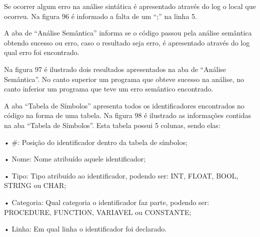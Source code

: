 \documentclass[12pt,oneside,a4paper,chapter=TITLE,section=TITLE,sumario=tradicional]{abntex2}
\begin{document}
\begin{figure}[H]
\end{figure}

Se ocorrer algum erro na análise sintática é apresentado através do log o local que ocorreu. Na figura 96 é informado a falta de um “;” na linha 5.

\begin{figure}[H]
\end{figure}


A aba de “Análise Semântica” informa se o código passou pela análise semântica obtendo sucesso ou erro, caso o resultado seja erro, é apresentado através do log qual erro foi encontrado.

Na figura 97 é ilustrado dois resultados apresentados na aba de “Análise Semântica”. No canto superior um programa que obteve sucesso na análise, no canto inferior um programa que teve um erro semântico encontrado.

\begin{figure}[H]
\end{figure}

A aba “Tabela de Símbolos” apresenta todos os identificadores encontrados no código na forma de uma tabela. 
Na figura 98 é ilustrado as informações contidas na aba “Tabela de Símbolos”. Esta tabela possui 5 colunas, sendo elas:

•	\#: Posição do identificador dentro da tabela de símbolos;

•	Nome: Nome atribuído aquele identificador;

•	Tipo: Tipo atribuído ao identificador, podendo ser: INT, FLOAT, BOOL, STRING ou CHAR;

•	Categoria: Qual categoria o identificador faz parte, podendo ser: PROCEDURE, FUNCTION, VARIAVEL ou CONSTANTE;

•	Linha: Em qual linha o identificador foi declarado.

\begin{figure}[H]
\end{figure}
\end{document}

